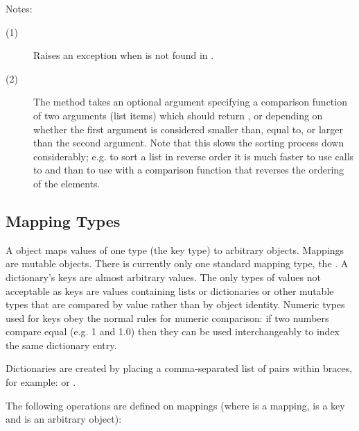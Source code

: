 \noindent
Notes:
\begin{description}
\item[(1)] Raises an exception when  is not found in .
  
\item[(2)] The  method takes an optional argument
  specifying a comparison function of two arguments (list items) which
  should return ,  or  depending on whether the
  first argument is considered smaller than, equal to, or larger than the
  second argument.  Note that this slows the sorting process down
  considerably; e.g. to sort a list in reverse order it is much faster
  to use calls to  and  than to use
   with a comparison function that reverses the ordering of
  the elements.
\end{description}

\subsection{Mapping Types}

A  object maps values of one type (the key type) to
arbitrary objects.  Mappings are mutable objects.  There is currently
only one standard mapping type, the .  A dictionary's keys are
almost arbitrary values.  The only types of values not acceptable as
keys are values containing lists or dictionaries or other mutable
types that are compared by value rather than by object identity.
Numeric types used for keys obey the normal rules for numeric
comparison: if two numbers compare equal (e.g. 1 and 1.0) then they
can be used interchangeably to index the same dictionary entry.


Dictionaries are created by placing a comma-separated list of
 pairs within braces, for example:
 or
.

The following operations are defined on mappings (where  is a
mapping,  is a key and  is an arbitrary object):

